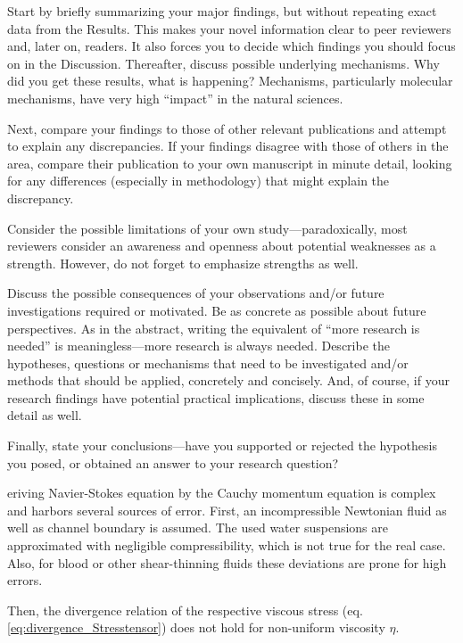 Start by briefly summarizing your major findings, but without repeating exact data from the Results. This makes your novel information clear to peer reviewers and, later on, readers. It also forces you to decide which findings you should focus on in the Discussion.
Thereafter, discuss possible underlying mechanisms. Why did you get these results, what is happening? Mechanisms, particularly molecular mechanisms, have very high “impact” in the natural sciences.

Next, compare your findings to those of other relevant publications and attempt to explain any discrepancies. If your findings disagree with those of others in the area, compare their publication to your own manuscript in minute detail, looking for any differences (especially in methodology) that might explain the discrepancy.

Consider the possible limitations of your own study—paradoxically, most reviewers consider an awareness and openness about potential weaknesses as a strength. However, do not forget to emphasize strengths as well.

Discuss the possible consequences of your observations and/or future investigations required or motivated. Be as concrete as possible about future perspectives. As in the abstract, writing the equivalent of “more research is needed” is meaningless—more research is always needed. Describe the hypotheses, questions or mechanisms that need to be investigated and/or methods that should be applied, concretely and concisely. And, of course, if your research findings have potential practical implications, discuss these in some detail as well.

Finally, state your conclusions—have you supported or rejected the hypothesis you posed, or obtained an answer to your research question?





eriving Navier-Stokes equation by the Cauchy momentum equation is complex and harbors several sources of error. First, an incompressible Newtonian fluid as well as channel boundary is assumed. The used water suspensions are approximated with negligible compressibility, which is not true for the real case. Also, for blood or other shear-thinning fluids these deviations are prone for high errors.  

Then, the divergence relation of the respective viscous stress (eq. \ref{eq:divergence_Stresstensor}) does not hold for non-uniform viscosity $\eta$.

